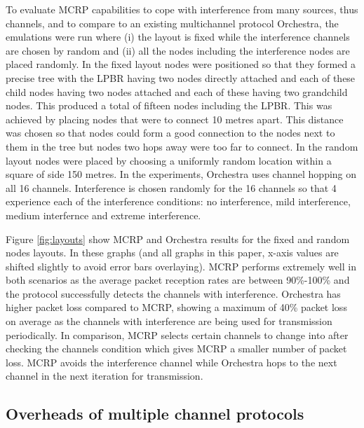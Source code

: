 To evaluate MCRP capabilities to cope with interference from many sources, thus channels, and to compare to an existing multichannel protocol Orchestra, the emulations were run where (i) the layout is fixed while the interference channels are chosen by random and (ii) all the nodes including the interference nodes are placed randomly.
In the fixed layout nodes were positioned so that they formed a precise tree with the LPBR having two nodes directly attached and each of these child nodes having two nodes attached and each of these having two grandchild nodes. This produced a total of fifteen nodes including the LPBR. This was achieved by placing nodes that were to connect 10 metres apart. This distance was chosen so that nodes could form a good connection to the nodes next to them in the tree but nodes two hops away were too far to connect. In the random layout nodes were placed by choosing a uniformly random location within a square of side 150 metres.
In the experiments, Orchestra uses channel hopping on all 16 channels.  Interference is chosen randomly for the 16 channels so that 4 experience each of the interference conditions: no interference, mild interference, medium interfernce and extreme interference.


Figure \ref{fig:layouts} show MCRP and Orchestra results for the fixed and random nodes layouts.  In these graphs (and all graphs in this paper, x-axis values are shifted slightly to avoid error bars overlaying).
MCRP performs extremely well in both scenarios as the average packet reception rates are between 90\%-100\% and the protocol successfully detects the channels with interference.
Orchestra has higher packet loss compared to MCRP, showing a maximum of 40\% packet loss on average as the channels with interference are being used for transmission periodically. 
In comparison, MCRP selects certain channels to change into after checking the channels condition which gives MCRP a smaller number of packet loss.
MCRP avoids the interference channel while Orchestra hops to the next channel in the next iteration for transmission.

\subsection{Overheads of multiple channel protocols}

